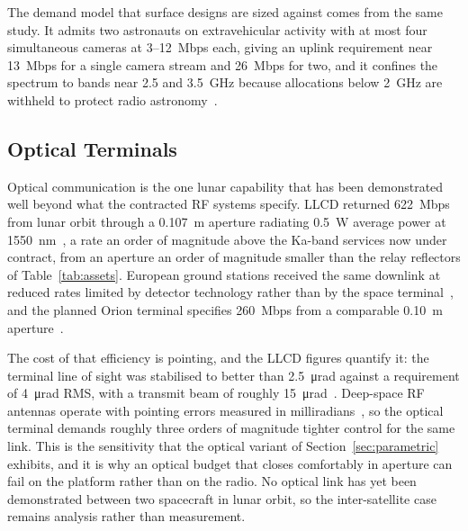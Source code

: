 \documentclass[11pt,a4paper]{article}
\begin{document}
The demand model that surface designs are sized against comes from the same study. It admits two astronauts on extravehicular activity with at most four simultaneous cameras at \SI{3}{}--\SI{12}{Mbps} each, giving an uplink requirement near \SI{13}{Mbps} for a single camera stream and \SI{26}{Mbps} for two, and it confines the spectrum to bands near \SI{2.5}{} and \SI{3.5}{GHz} because allocations below \SI{2}{GHz} are withheld to protect radio astronomy~\cite{nokia_lunar_3gpp}.

\subsection{Optical Terminals}
Optical communication is the one lunar capability that has been demonstrated well beyond what the contracted RF systems specify. LLCD returned \SI{622}{Mbps} from lunar orbit through a \SI{0.107}{m} aperture radiating \SI{0.5}{W} average power at \SI{1550}{nm}~\cite{boroson_llcd}, a rate an order of magnitude above the Ka-band services now under contract, from an aperture an order of magnitude smaller than the relay reflectors of Table~\ref{tab:assets}. European ground stations received the same downlink at reduced rates limited by detector technology rather than by the space terminal~\cite{giggenbach_locl}, and the planned Orion terminal specifies \SI{260}{Mbps} from a comparable \SI{0.10}{m} aperture~\cite{nasa_o2o}.

The cost of that efficiency is pointing, and the LLCD figures quantify it: the terminal line of sight was stabilised to better than \SI{2.5}{\micro\radian} against a requirement of \SI{4}{\micro\radian} RMS, with a transmit beam of roughly \SI{15}{\micro\radian}~\cite{boroson_llcd}. Deep-space RF antennas operate with pointing errors measured in milliradians~\cite{dsn_810_005}, so the optical terminal demands roughly three orders of magnitude tighter control for the same link. This is the sensitivity that the optical variant of Section~\ref{sec:parametric} exhibits, and it is why an optical budget that closes comfortably in aperture can fail on the platform rather than on the radio. No optical link has yet been demonstrated between two spacecraft in lunar orbit, so the inter-satellite case remains analysis rather than measurement.
\end{document}
